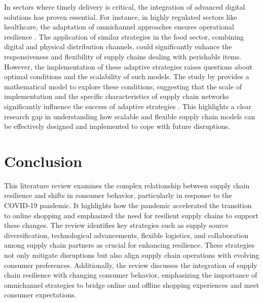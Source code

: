 In sectors where timely delivery is critical, the integration of advanced digital solutions has proven essential. For instance, in highly regulated sectors like healthcare, the adaptation of omnichannel approaches ensures operational resilience \parencite{RiveroGutierrez2020OmnichannelSector}. The application of similar strategies in the food sector, combining digital and physical distribution channels, could significantly enhance the responsiveness and flexibility of supply chains dealing with perishable items. However, the implementation of these adaptive strategies raises questions about optimal conditions and the scalability of such models. The study by \textcite{Zhang2020IntegrationBOPS} provides a mathematical model to explore these conditions, suggesting that the scale of implementation and the specific characteristics of supply chain networks significantly influence the success of adaptive strategies \parencite{Zhang2020IntegrationBOPS}. This highlights a clear research gap in understanding how scalable and flexible supply chain models can be effectively designed and implemented to cope with future disruptions.



\section{Conclusion}

This literature review examines the complex relationship between supply chain resilience and shifts in consumer behavior, particularly in response to the COVID-19 pandemic. It highlights how the pandemic accelerated the transition to online shopping and emphasized the need for resilient supply chains to support these changes. The review identifies key strategies such as supply source diversification, technological advancements, flexible logistics, and collaboration among supply chain partners as crucial for enhancing resilience. These strategies not only mitigate disruptions but also align supply chain operations with evolving consumer preferences. Additionally, the review discusses the integration of supply chain resilience with changing consumer behavior, emphasizing the importance of omnichannel strategies to bridge online and offline shopping experiences and meet consumer expectations.


